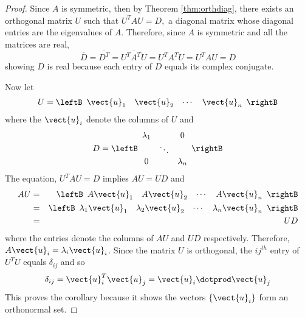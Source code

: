 \begin{proof}
Since $A$ is symmetric, then by Theorem \ref{thm:orthdiag},
there exists an orthogonal matrix $U$ such that $U^{T}AU=D,$ a diagonal
matrix whose diagonal entries are the eigenvalues of $A.$ Therefore, since $
A $ is symmetric and all the matrices are real, 
\begin{equation*}
\overline{D}=\overline{D^{T}}=\overline{U^{T}A^{T}U}=U^{T}A^{T}U=U^{T}AU=D
\end{equation*}
showing $D$ is real because each entry of $D$ equals its complex conjugate.

Now let 
\begin{equation*}
U=\leftB
\begin{array}{cccc}
\vect{u}_{1} & \vect{u}_{2} & \cdots & \vect{u}_{n}
\end{array}
\rightB
\end{equation*}
where the $\vect{u}_{i}$ denote the columns of $U$ and 
\begin{equation*}
D=\leftB
\begin{array}{ccc}
\lambda _{1} &  & 0 \\ 
& \ddots &  \\ 
0 &  & \lambda _{n}
\end{array}
\rightB
\end{equation*}
The equation, $U^{T}AU=D$ implies $AU = UD$ and 
\begin{eqnarray*}
AU &=&\leftB 
\begin{array}{cccc}
A\vect{u}_{1} & A\vect{u}_{2} & \cdots & A\vect{u}_{n}%
\end{array}
\rightB \\
&=&\leftB 
\begin{array}{cccc}
\lambda _{1}\vect{u}_{1} & \lambda _{2}\vect{u}_{2} & \cdots & \lambda
_{n}\vect{u}_{n}
\end{array}
\rightB \\
&=& UD
\end{eqnarray*}
where the entries denote the columns of $AU$ and $UD$ respectively.
Therefore, $A\vect{u}_{i}=\lambda _{i}\vect{u}_{i}$.  Since the matrix $U$
is orthogonal, the $ij^{th}$ entry of $U^{T}U$ equals $\delta _{ij}$ and so 
\begin{equation*}
\delta _{ij}=\vect{u}_{i}^{T}\vect{u}_{j}=\vect{u}_{i}\dotprod \vect{u}
_{j}
\end{equation*}
This proves the corollary because it shows the vectors $\left\{ \vect{u}
_{i}\right\} $ form an orthonormal set.
\end{proof}

